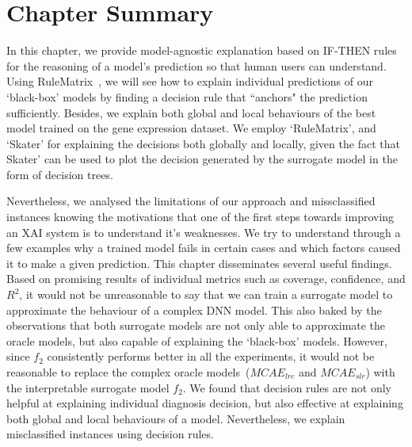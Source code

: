 
\section{Chapter Summary} \label{chapter_7:conclusion}
In this chapter, we provide model-agnostic explanation based on IF-THEN rules for the reasoning of a model's prediction so that human users can understand. %
Using RuleMatrix~\cite{ming2018rulematrix}, we will see how to explain individual predictions of our `black-box' models by finding a decision rule that ``anchors" the prediction sufficiently. Besides, we explain both global and local behaviours of the best model trained on the gene expression dataset. We employ `RuleMatrix', and `Skater' for explaining the decisions both globally and locally, given the fact that Skater' can be used to plot the decision generated by the surrogate model in the form of decision trees.  

\hspace*{3.5mm} Nevertheless, we analysed the limitations of our approach and missclassified instances knowing the motivations that one of the first steps towards improving an XAI system is to understand it’s weaknesses. We try to understand through a few examples why a trained model fails in certain cases and which factors caused it to make a given prediction. This chapter disseminates several useful findings. Based on promising results of individual metrics such as coverage, confidence, and $R^2$, it would not be unreasonable to say that we can train a surrogate model to approximate the behaviour of a complex DNN model. This also baked by the observations that both surrogate models are not only able to approximate the oracle models, but also capable of  explaining the `black-box' models. However, since $f_2$ consistently performs better in all the experiments, it would not be reasonable to replace the complex oracle models~($MCAE_{lrc}$ and $MCAE_{slr}$) with the interpretable surrogate model $f_2$. We found that decision rules are not only helpful at explaining individual diagnosis decision, but also effective at explaining both global and local behaviours of a model. Nevertheless, we explain misclassified instances using decision rules. 

